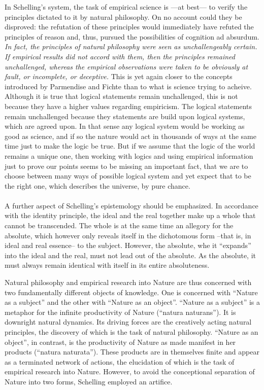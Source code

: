 \documentclass[10pt,a4paper]{article}
\begin{document}
                In Schelling's system, the task of empirical science is —at best— to verify the principles dictated to it by natural philosophy. On no account could they be disproved: the refutation of these principles would immediately have refuted the principles of reason and, thus, pursued the possibilities of cognition ad absurdum. \textit{In fact, the principles of natural philosophy were seen as unchallengeably certain. If empirical results did not accord with them, then the principles remained unchallenged, whereas the empirical observations were taken to be obviously at fault, or incomplete, or deceptive.} This is yet again closer to the concepts introduced by Parmendise and Fichte than to what is science trying to acheive. Although it is true that logical statements remain unchallenged, this is not because they have a higher values regarding empiricism. The logical statements remain unchallenged because they statements are build upon logical systems, which are agreed upon. In that sense any logical system would be working as good as science, and if so the nature would act in thousands of ways at the same time just to make the logic be true. But if we assume that the logic of the world remains a unique one, then working with logics and using empirical information just to prove our points seems to be missing an important fact, that we are to choose between many ways of possible logical system and yet expect that to be the right one, which describes the universe, by pure chance.
                \\
                \\
                A further aspect of Schelling's epistemology should be emphasized. In accordance with the identity principle, the ideal and the real together make up a whole that cannot be transcended. The whole is at the same time an allegory for the absolute, which however only reveals itself in the dichotomous form --that is, in ideal and real essence-- to the subject. However, the absolute, whe it “expands” into the ideal and the real, must not lead out of the absolute. As the absolute, it must always remain identical with itself in its entire absoluteness.
                \begin{qt}
                    Natural philosophy and empirical research into Nature are thus concerned with two fundamentally different objects of knowledge. One is concerned with “Nature as a subject” and the other with “Nature as an object”. “Nature as a subject” is a metaphor for the infinite productivity of Nature (“natura naturans”). It is downright natural dynamics. Its driving forces are the creatively acting natural principles, the discovery of which is the task of natural philosophy.  “Nature as an object”, in contrast, is the productivity of Nature as made manifest in her products (“natura naturata”). These products are in themselves finite and appear as a terminated network of actions, the elucidation of which is the task of empirical research into Nature. However, to avoid the conceptional separation of Nature into two forms, Schelling employed an artifice.
                \end{qt}
\end{document}
